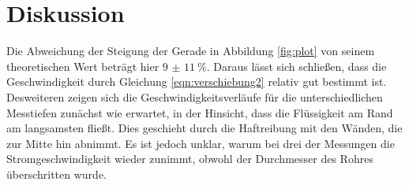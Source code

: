 \section{Diskussion}

Die Abweichung der Steigung der Gerade in Abbildung \ref{fig:plot} von seinem theoretischen Wert beträgt
hier $\qty{9(11)}{\percent}$. Daraus lässt sich schließen, dass die Geschwindigkeit durch Gleichung \ref{eqn:verschiebung2}
relativ gut bestimmt ist.\\
\noindent Desweiteren zeigen sich die Geschwindigkeitsverläufe für die unterschiedlichen Messtiefen zunächst wie 
erwartet, in der Hinsicht, dass die Flüssigkeit am Rand am langsamsten fließt. Dies geschieht durch die 
Haftreibung mit den Wänden, die zur Mitte hin abnimmt. Es ist jedoch unklar, warum bei drei der Messungen die 
Stromgeschwindigkeit wieder zunimmt, obwohl der Durchmesser des Rohres überschritten wurde.

\label{sec:Diskussion}
